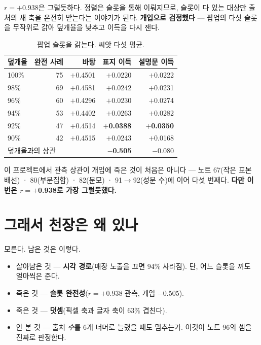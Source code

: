 \documentclass[10pt]{article}
\begin{document}
$r=+$0.938은 그럴듯하다. 정렬은 슬롯을 통해 이뤄지므로, 슬롯이 다 있는 대상만
출처의 새 축을 온전히 받는다는 이야기가 된다. \textbf{개입으로 검정했다} ---
팝업의 다섯 슬롯을 무작위로 갉아 덮개율을 낮추고 이득을 다시 잰다.

\begin{table}[t]
\centering\tsize
\caption{팝업 슬롯을 갉는다. 씨앗 다섯 평균.}
\begin{tabular}{lrrrr}
\toprule
덮개율 & 완전 사례 & 바탕 & 표지 이득 & 설명문 이득 \\
\midrule
100\% & 75 & $+$0.4501 & $+$0.0220 & $+$0.0222 \\
98\% & 69 & $+$0.4581 & $+$0.0242 & $+$0.0231 \\
96\% & 60 & $+$0.4296 & $+$0.0230 & $+$0.0274 \\
94\% & 53 & $+$0.4402 & $+$0.0263 & $+$0.0282 \\
92\% & 47 & $+$0.4514 & \textbf{$+$0.0388} & \textbf{$+$0.0350} \\
90\% & 42 & $+$0.4515 & $+$0.0243 & $+$0.0168 \\
\midrule
\multicolumn{3}{l}{덮개율과의 상관} & \textbf{$-$0.505} & $-$0.080 \\
\bottomrule
\end{tabular}
\end{table}


이 프로젝트에서 관측 상관이 개입에 죽은 것이 처음은 아니다 --- 노트 67(작은
표본 배선) · 80(부분집합) · 82(분모) · 91$\to$92(성분 수)에 이어 다섯 번째다.
\textbf{다만 이번은 $r=+$0.938로 가장 그럴듯했다.}

\section{그래서 천장은 왜 있나}

모른다. 남은 것은 이렇다.

\begin{itemize}[leftmargin=1.1em,itemsep=0.15em]
\item 살아남은 것 --- \textbf{시각 경로}(매장 노출을 끄면 94\% 사라짐).
      단, 어느 슬롯을 꺼도 얼마씩은 준다.
\item 죽은 것 --- \textbf{슬롯 완전성}($r=+$0.938 관측, 개입 $-$0.505).
\item 죽은 것 --- \textbf{덧셈}(픽셀 축과 글자 축이 63\% 겹친다).
\item 안 본 것 --- 출처 \emph{수}를 6개 너머로 늘렸을 때도 멈추는가. 이것이
      노트 96의 셈을 진짜로 판정한다.
\end{itemize}
\end{document}
